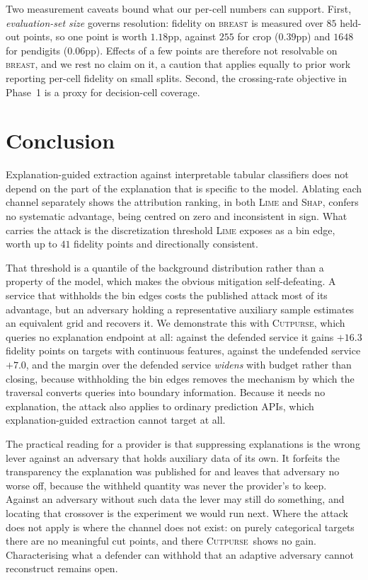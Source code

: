 \documentclass[sigconf,anonymous,review]{acmart}
\newcommand{\sys}{\textsc{Cutpurse}}
\begin{document}
Two measurement caveats bound what our per-cell numbers can support. First, \emph{evaluation-set size}
governs resolution: fidelity on \textsc{breast} is measured over $85$ held-out points, so one point is
worth $1.18$pp, against $255$ for crop ($0.39$pp) and $1648$ for pendigits ($0.06$pp). Effects of a few
points are therefore not resolvable on \textsc{breast}, and we rest no claim on it, a caution that
applies equally to prior work reporting per-cell fidelity on small splits. Second, the
crossing-rate objective in Phase~1 is a proxy for decision-cell coverage.

\section{Conclusion}
Explanation-guided extraction against interpretable tabular classifiers does not depend on the part of
the explanation that is specific to the model. Ablating each channel separately shows the attribution
ranking, in both \textsc{Lime} and \textsc{Shap}, confers no systematic advantage, being centred on
zero and inconsistent in sign. What carries the attack is the discretization threshold \textsc{Lime}
exposes as a bin edge, worth up to $41$ fidelity points and directionally consistent.

That threshold is a quantile of the background distribution rather than a property of the model, which
makes the obvious mitigation self-defeating. A service that withholds the bin edges costs the
published attack most of its advantage, but an adversary holding a representative auxiliary sample
estimates an equivalent grid and recovers it. We demonstrate this with \sys, which queries no
explanation endpoint at all: against the defended service it gains $+16.3$ fidelity points on targets
with continuous features, against the undefended service $+7.0$, and the margin over the defended
service \emph{widens} with budget rather than closing, because withholding the bin edges removes the
mechanism by which the traversal converts queries into boundary information. Because it needs no
explanation, the attack also applies to ordinary prediction APIs, which explanation-guided extraction
cannot target at all.

The practical reading for a provider is that suppressing explanations is the wrong lever against an
adversary that holds auxiliary data of its own. It forfeits the transparency the explanation was
published for and leaves that adversary no worse off, because the withheld quantity was never the
provider's to keep. Against an adversary without such data the lever may still do something, and
locating that crossover is the experiment we would run next. Where the attack does not apply is where the
channel does not exist: on purely categorical targets there are no meaningful cut points, and there
\sys\ shows no gain. Characterising what a defender can withhold that an adaptive adversary cannot
reconstruct remains open.
\end{document}
